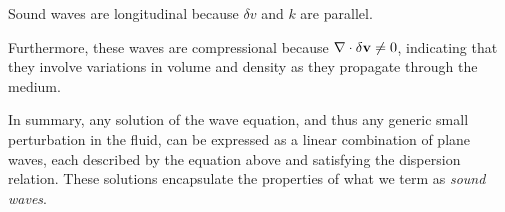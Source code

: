 {\color{red}Sound waves are longitudinal because \( \delta v \) and \( k  \) are parallel.}

Furthermore, these waves are compressional because \( \nabla \cdot \delta \vb v \ne 0 \), indicating that they involve variations in volume and density as they propagate through the medium.

In summary, any solution of the wave equation, and thus any generic small perturbation in the fluid, can be expressed as a linear combination of plane waves, each described by the equation above and satisfying the dispersion relation. These solutions encapsulate the properties of what we term as \emph{sound waves}.

